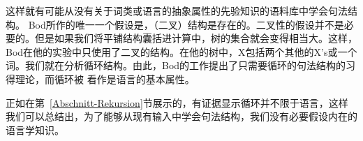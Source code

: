 
这样就有可能从没有关于词类或语言的抽象属性的先验知识的语料库中学会句法结构。
Bod所作的唯一一个假设是，（二叉）结构是存在的。二叉性的假设并不是必要的。但是如果我们将平铺结构囊括进计算中，树的集合就会变得相当大。这样，Bod在他的实验中只使用了二叉的结构。在他的树中，X包括两个其他的X's或一个词。我们就在分析循环结构。由此，Bod的工作提出了只需要循环的句法结构的习得理论，而循环被 \citet*{HCF2002a}看作是语言的基本属性。

正如在第~\ref{Abschnitt-Rekursion}节展示的，有证据显示循环并不限于语言，这样我们可以总结出，为了能够从现有输入中学会句法结构，我们没有必要假设内在的语言学知识。

